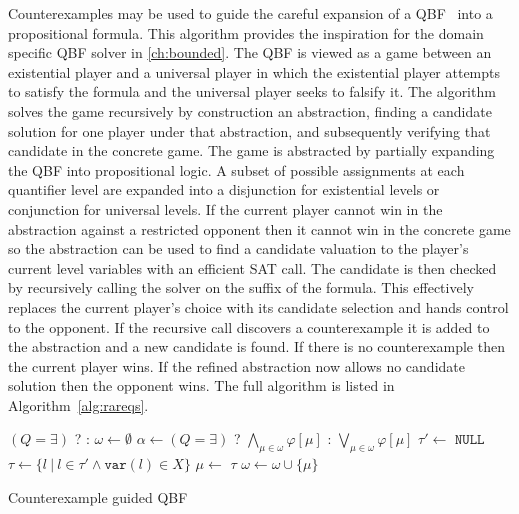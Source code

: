 Counterexamples may be used to guide the careful expansion of a QBF~\cite{Janota15} into a propositional formula. This algorithm provides the inspiration for the domain specific QBF solver in \ref{ch:bounded}. The QBF is viewed as a game between an existential player and a universal player in which the existential player attempts to satisfy the formula and the universal player seeks to falsify it. The algorithm solves the game recursively by construction an abstraction, finding a candidate solution for one player under that abstraction, and subsequently verifying that candidate in the concrete game. The game is abstracted by partially expanding the QBF into propositional logic. A subset of possible assignments at each quantifier level are expanded into a disjunction for existential levels or conjunction for universal levels. If the current player cannot win in the abstraction against a restricted opponent then it cannot win in the concrete game so the abstraction can be used to find a candidate valuation to the player's current level variables with an efficient SAT call. The candidate is then checked by recursively calling the solver on the suffix of the formula. This effectively replaces the current player's choice with its candidate selection and hands control to the opponent. If the recursive call discovers a counterexample it is added to the abstraction and a new candidate is found. If there is no counterexample then the current player wins. If the refined abstraction now allows no candidate solution then the opponent wins. The full algorithm is listed in Algorithm~\ref{alg:rareqs}.

\begin{algorithm}
    \begin{algorithmic}[1]
            \State \Return $(Q = \exists)$ ?  : 
        \EndIf
        \State $\omega \gets \emptyset$
        \Loop
        \State $\alpha \gets (Q = \exists)$ ? $\bigwedge_{\mu \in \omega} \varphi[\mu]$ : $\bigvee_{\mu \in \omega} \varphi[\mu]$
        \State $\tau' \gets$ 
         \Return $\texttt{NULL}$ \EndIIf
        \State $\tau \gets \{ l\ |\ l \in \tau' \land \texttt{var}(l) \in X \}$
        \State $\mu \gets $ 
         \Return $\tau$ \EndIIf
        \State $\omega \gets \omega \cup \{ \mu \}$
        \EndLoop
        \EndFunction
    \end{algorithmic}
    \caption{Counterexample guided QBF}
    \label{alg:rareqs}
\end{algorithm}

